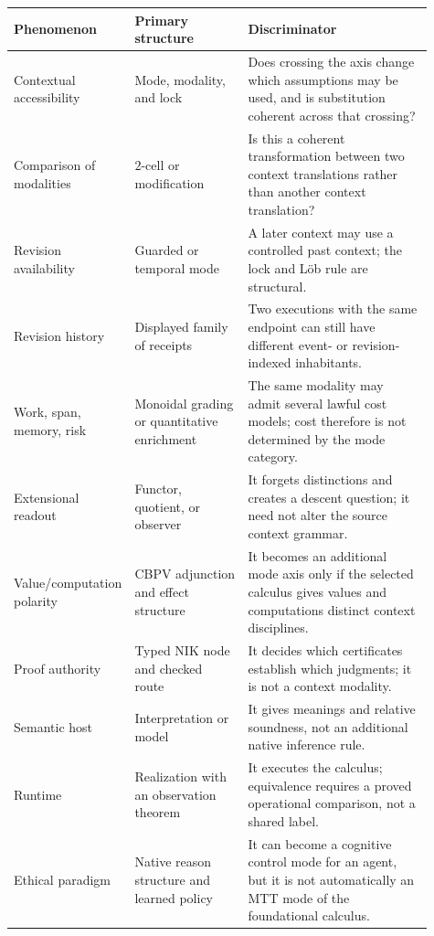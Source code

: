 \documentclass[11pt]{article}
\theoremstyle{definition}
\theoremstyle{remark}
\begin{document}
\begin{longtable}{>{\raggedright\arraybackslash}p{0.20\linewidth}%
                  >{\raggedright\arraybackslash}p{0.27\linewidth}%
                  >{\raggedright\arraybackslash}p{0.44\linewidth}}
\toprule
Phenomenon & Primary structure & Discriminator \\
\midrule
\endhead
Contextual accessibility & Mode, modality, and lock & Does crossing the axis
  change which assumptions may be used, and is substitution coherent across
  that crossing? \\
Comparison of modalities & $2$-cell or modification & Is this a coherent
  transformation between two context translations rather than another
  context translation? \\
Revision availability & Guarded or temporal mode & A later context may use a
  controlled past context; the lock and L\"ob rule are structural. \\
Revision history & Displayed family of receipts & Two executions with the same
  endpoint can still have different event- or revision-indexed inhabitants. \\
Work, span, memory, risk & Monoidal grading or quantitative enrichment & The
  same modality may admit several lawful cost models; cost therefore is not
  determined by the mode category. \\
Extensional readout & Functor, quotient, or observer & It forgets distinctions
  and creates a descent question; it need not alter the source context grammar. \\
Value/computation polarity & CBPV adjunction and effect structure & It becomes
  an additional mode axis only if the selected calculus gives values and
  computations distinct context disciplines. \\
Proof authority & Typed NIK node and checked route & It decides which
  certificates establish which judgments; it is not a context modality. \\
Semantic host & Interpretation or model & It gives meanings and relative
  soundness, not an additional native inference rule. \\
Runtime & Realization with an observation theorem & It executes the calculus;
  equivalence requires a proved operational comparison, not a shared label. \\
Ethical paradigm & Native reason structure and learned policy & It can become a
  cognitive control mode for an agent, but it is not automatically an MTT mode
  of the foundational calculus. \\
\bottomrule
\end{longtable}
\end{document}
